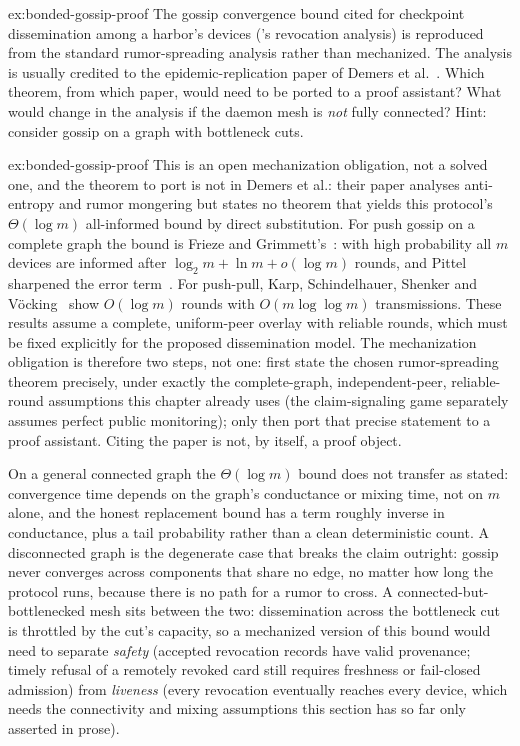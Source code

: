 \documentclass[11pt,a4paper]{article}
\theoremstyle{definition}
\theoremstyle{remark}
\begin{document}
\begin{pdexercise}[kind=Open,rating=3]{ex:bonded-gossip-proof}
The gossip convergence bound cited for checkpoint dissemination among a harbor's devices ('s revocation analysis) is reproduced from the standard rumor-spreading analysis rather than mechanized. The analysis is usually credited to the epidemic-replication paper of Demers et al.~. Which theorem, from which paper, would need to be ported to a proof assistant? What would change in the analysis if the daemon mesh is \emph{not} fully connected? Hint: consider gossip on a graph with bottleneck cuts.
\end{pdexercise}
\begin{pdsolution}{ex:bonded-gossip-proof}
This is an open mechanization obligation, not a solved one, and the theorem to port is not in Demers et al.: their paper analyses anti-entropy and rumor mongering but states no theorem that yields this protocol's $\Theta(\log m)$ all-informed bound by direct substitution. For push gossip on a complete graph the bound is Frieze and Grimmett's~: with high probability all $m$ devices are informed after $\log_2 m+\ln m+o(\log m)$ rounds, and Pittel sharpened the error term~. For push-pull, Karp, Schindelhauer, Shenker and V\"ocking~ show $O(\log m)$ rounds with $O(m\log\log m)$ transmissions. These results assume a complete, uniform-peer overlay with reliable rounds, which must be fixed explicitly for the proposed dissemination model. The mechanization obligation is therefore two steps, not one: first state the chosen rumor-spreading theorem precisely, under exactly the complete-graph, independent-peer, reliable-round assumptions this chapter already uses (the claim-signaling game separately assumes perfect public monitoring); only then port that precise statement to a proof assistant. Citing the paper is not, by itself, a proof object.

On a general connected graph the $\Theta(\log m)$ bound does not transfer as stated: convergence time depends on the graph's conductance or mixing time, not on $m$ alone, and the honest replacement bound has a term roughly inverse in conductance, plus a tail probability rather than a clean deterministic count. A disconnected graph is the degenerate case that breaks the claim outright: gossip never converges across components that share no edge, no matter how long the protocol runs, because there is no path for a rumor to cross. A connected-but-bottlenecked mesh sits between the two: dissemination across the bottleneck cut is throttled by the cut's capacity, so a mechanized version of this bound would need to separate \emph{safety} (accepted revocation records have valid provenance; timely refusal of a remotely revoked card still requires freshness or fail-closed admission) from \emph{liveness} (every revocation eventually reaches every device, which needs the connectivity and mixing assumptions this section has so far only asserted in prose).
\end{pdsolution}
\end{document}
